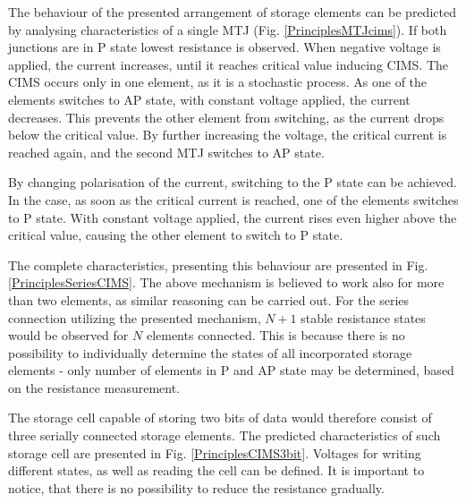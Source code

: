     The behaviour of the presented arrangement of storage elements can be predicted by analysing characteristics of a single MTJ (Fig. \ref{PrinciplesMTJcims}). If both junctions are in P state lowest resistance is observed. When negative voltage is applied, the current increases, until it reaches critical value inducing CIMS. The CIMS occurs only in one element, as it is a stochastic process. As one of the elements switches to AP state, with constant voltage applied, the current decreases. This prevents the other element from switching, as the current drops below the critical value. By further increasing the voltage, the critical current is reached again, and the second MTJ switches to AP state.
    
    By changing polarisation of the current, switching to the P state can be achieved. In the case, as soon as the critical current is reached, one of the elements switches to P state. With constant voltage applied, the current rises even higher above the critical value, causing the other element to switch to P state. 
    
    The complete characteristics, presenting this behaviour are presented in Fig. \ref{PrinciplesSeriesCIMS}. The above mechanism is believed to work also for more than two elements, as similar reasoning can be carried out. For the series connection utilizing the presented mechanism, $N+1$ stable resistance states would be observed for $N$ elements connected. This is because there is no possibility to individually determine the states of all incorporated storage elements - only number of elements in P and AP state may be determined, based on the resistance measurement.
    
    The storage cell capable of storing two bits of data would therefore consist of three serially connected storage elements. The predicted characteristics of such storage cell are presented in Fig. \ref{PrinciplesCIMS3bit}. Voltages for writing different states, as well as reading the cell can be defined. It is important to notice, that there is no possibility to reduce the resistance gradually.
    
